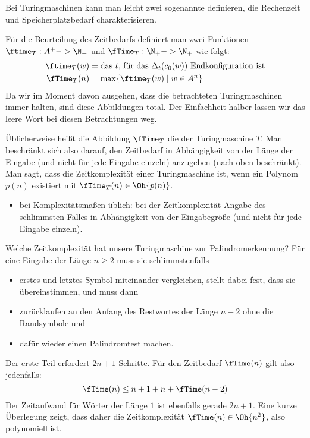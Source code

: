 Bei Turingmaschinen kann man leicht zwei sogenannte
definieren, die Rechenzeit und Speicherplatzbedarf charakterisieren.

Für die Beurteilung des Zeitbedarfs definiert man zwei Funktionen
$\ftime_T:A^+ -> \N_+$ und $\fTime_T:\N_+ -> \N_+$ wie folgt:
\begin{align*}
  \ftime_T(w) &= \text{das $t$, für das $\Delta_t(c_0(w))$ Endkonfiguration ist} \\
  \fTime_T(n)   &= \max \{\ftime_T(w) \mid w\in A^n\}
\end{align*}
%
Da wir im Moment davon ausgehen, dass die betrachteten Turingmaschinen
immer halten, sind diese Abbildungen total. Der Einfachheit halber
lassen wir das leere Wort bei diesen Betrachtungen weg.

Üblicherweise heißt die Abbildung $\fTime_T$ die
 der Turingmaschine
$T$. Man beschränkt sich also darauf, den Zeitbedarf in Abhängigkeit
von der Länge der Eingabe (und nicht für jede Eingabe einzeln)
anzugeben (nach oben beschränkt).  Man sagt, dass die Zeitkomplexität
einer Turingmaschine 
ist, wenn ein Polynom $p(n)$ existiert mit
$\fTime_T(n)\in\Oh{p(n)}$.

\begin{tutorium}
  \begin{itemize}
  \item bei Komplexitätsmaßen üblich: \zB bei der Zeitkomplexität
    Angabe des schlimmsten Falles in Abhängigkeit von der
    Eingabegröße (und nicht für jede Eingabe einzeln).
  \end{itemize}
\end{tutorium}

Welche Zeitkomplexität hat unsere Turingmaschine zur
Palindromerkennung? Für eine Eingabe der Länge $n\geq 2$ muss sie
schlimmstenfalls
\begin{itemize}
\item erstes und letztes Symbol miteinander vergleichen, stellt dabei
  fest, dass sie übereinstimmen, und muss dann
\item zurücklaufen an den Anfang des Restwortes der Länge $n-2$ ohne
  die Randsymbole und
\item dafür wieder einen Palindromtest machen.
\end{itemize}
Der erste Teil erfordert $2n+1$ Schritte.
Für den Zeitbedarf $\fTime(n)$ gilt also jedenfalls:
\begin{equation*}
  \fTime(n) \leq n+1 + n + \fTime(n-2)
\end{equation*}
Der Zeitaufwand für Wörter der Länge $1$ ist ebenfalls gerade
$2n+1$. Eine kurze Überlegung zeigt, dass daher die Zeitkomplexität
$\fTime(n) \in \Oh{n^2}$, also polynomiell ist.

